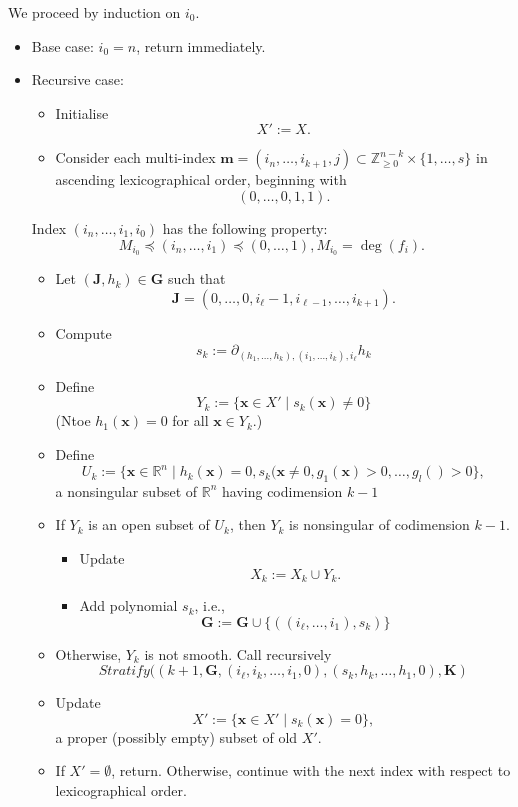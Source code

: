 \documentclass[
]{book}
\theoremstyle{definition}
\theoremstyle{definition}
\theoremstyle{definition}
\theoremstyle{definition}
\theoremstyle{remark}
\begin{document}
We proceed by induction on \(i_0\).

\begin{itemize}
\item
  Base case: \(i_0 = n\), return immediately.
\item
  Recursive case:

  \begin{itemize}
  \item
    Initialise \[X' := X.\]
  \item
    Consider each multi-index \(\mathbf{m} = (i_n,\ldots,i_{k+1},j) \subset \mathbb{Z}_{\ge 0}^{n-k} \times \{1,\ldots,s\}\) in ascending lexicographical order, beginning with \[
    (0,\ldots,0,1,1).
    \]
  \end{itemize}

  Index \((i_n,\ldots,i_1,i_0)\) has the following property:
  \[
  M_{i_0} \preceq (i_n,\ldots,i_1) \preceq (0,\ldots,1), M_{i_0} = \deg(f_i).
  \]

  \begin{itemize}
  \item
    Let \((\mathbf{J}, h_k) \in \mathbf{G}\) such that \[
      \mathbf{J} = (0, \ldots, 0, i_{\ell} - 1, i_{\ell - 1}, \ldots, i_{k+1}).
      \]
  \item
    Compute
    \[
      s_k := \partial_{(h_1,\ldots,h_k), (i_1,\ldots,i_k), i_\ell} h_k
      \]
  \item
    Define
    \[
      Y_k := \{ \mathbf{x} \in X' \mid s_k(\mathbf{x}) \ne 0 \}
      \]
    (Ntoe \(h_1(\mathbf{x}) = 0\) for all \(\mathbf{x} \in Y_k\).)
  \item
    Define
    \[
      U_k := \{ \mathbf{x} \in \mathbb{R}^n \mid h_k(\mathbf{x}) = 0, s_k(\mathbf{x} \ne 0, g_1(\mathbf{x}) > 0 , \ldots, g_l(\mathbf{}) > 0 \},
      \]
    a nonsingular subset of \(\mathbb{R}^n\) having codimension \(k-1\)
  \item
    If \(Y_k\) is an open subset of \(U_k\), then \(Y_k\) is nonsingular of codimension \(k-1\).

    \begin{itemize}
    \item
      Update \[X_k := X_k \cup Y_k.\]
    \item
      Add polynomial \(s_k\), i.e.,
      \[
      \mathbf{G} := \mathbf{G} \cup \{ ((i_\ell,\ldots,i_1), s_k) \}
      \]
    \end{itemize}
  \item
    Otherwise, \(Y_k\) is not smooth. Call recursively
    \[
      Stratify((k+1, \mathbf{G}, (i_\ell,i_k,\ldots,i_1,0), (s_k,h_k,\ldots,h_1,0), \mathbf{K})
      \]
  \item
    Update
    \[
      X' := \{ \mathbf{x} \in X' \mid s_k(\mathbf{x}) = 0 \},
      \]
    a proper (possibly empty) subset of old \(X'\).
  \item
    If \(X' = \emptyset\), return. Otherwise, continue with the next index with respect to lexicographical order.
  \end{itemize}
\end{itemize}
\end{document}

